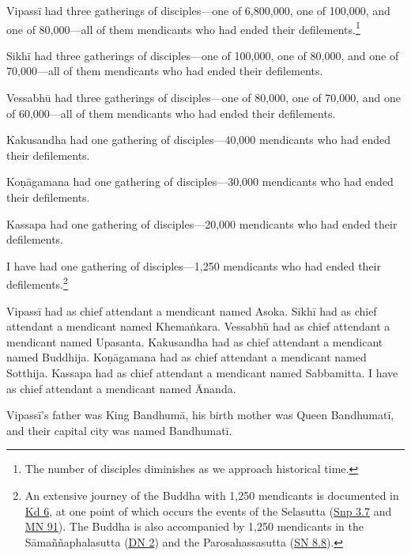 \documentclass[12pt,openany]{book}%
\begin{document}
\textsanskrit{Vipassī} had three gatherings of disciples—one of 6,800,000, one of 100,000, and one of 80,000—all of them mendicants who had ended their defilements.\footnote{The number of disciples diminishes as we approach historical time. } 

\textsanskrit{Sikhī} had three gatherings of disciples—one of 100,000, one of 80,000, and one of 70,000—all of them mendicants who had ended their defilements. 

\textsanskrit{Vessabhū} had three gatherings of disciples—one of 80,000, one of 70,000, and one of 60,000—all of them mendicants who had ended their defilements. 

Kakusandha had one gathering of disciples—40,000 mendicants who had ended their defilements. 

\textsanskrit{Koṇāgamana} had one gathering of disciples—30,000 mendicants who had ended their defilements. 

Kassapa had one gathering of disciples—20,000 mendicants who had ended their defilements. 

I have had one gathering of disciples—1,250 mendicants who had ended their defilements.\footnote{An extensive journey of the Buddha with 1,250 mendicants is documented in \href{https://suttacentral.net/pli-tv-kd6/en/sujato}{Kd 6}, at one point of which occurs the events of the Selasutta (\href{https://suttacentral.net/snp3.7/en/sujato}{Snp 3.7} and \href{https://suttacentral.net/mn91/en/sujato}{MN 91}). The Buddha is also accompanied by 1,250 mendicants in the \textsanskrit{Sāmaññaphalasutta} (\href{https://suttacentral.net/dn2/en/sujato}{DN 2}) and the Parosahassasutta (\href{https://suttacentral.net/sn8.8/en/sujato}{SN 8.8}). } 

\textsanskrit{Vipassī} had as chief attendant a mendicant named Asoka. \textsanskrit{Sikhī} had as chief attendant a mendicant named \textsanskrit{Khemaṅkara}. \textsanskrit{Vessabhū} had as chief attendant a mendicant named Upasanta. Kakusandha had as chief attendant a mendicant named Buddhija. \textsanskrit{Koṇāgamana} had as chief attendant a mendicant named Sotthija. Kassapa had as chief attendant a mendicant named Sabbamitta. I have as chief attendant a mendicant named Ānanda. 

\textsanskrit{Vipassī}’s father was King \textsanskrit{Bandhumā}, his birth mother was Queen \textsanskrit{Bandhumatī}, and their capital city was named \textsanskrit{Bandhumatī}. 
\end{document}
